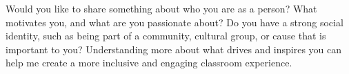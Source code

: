 \documentclass{ximera}
\author{Bart Snapp}
\begin{document}
\begin{question}
    Would you like to share something about who you are as a person? What
    motivates you, and what are you passionate about? Do you have a strong
    social identity, such as being part of a community, cultural group, or cause
    that is important to you? Understanding more about what drives and inspires you can
    help me create a more inclusive and engaging classroom experience.
    \begin{freeResponse}
    \end{freeResponse}
\end{question}
\end{document}
